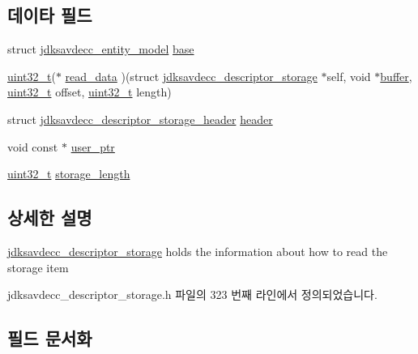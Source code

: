 \subsection*{데이타 필드}
\begin{DoxyCompactItemize}
\item 
struct \hyperlink{structjdksavdecc__entity__model}{jdksavdecc\+\_\+entity\+\_\+model} \hyperlink{structjdksavdecc__descriptor__storage_ab9b4b2eaa5e1a290a371291da6a9a4d6}{base}
\item 
\hyperlink{parse_8c_a6eb1e68cc391dd753bc8ce896dbb8315}{uint32\+\_\+t}($\ast$ \hyperlink{structjdksavdecc__descriptor__storage_ab52d121ecc306cef68974022b2789962}{read\+\_\+data} )(struct \hyperlink{structjdksavdecc__descriptor__storage}{jdksavdecc\+\_\+descriptor\+\_\+storage} $\ast$self, void $\ast$\hyperlink{_hello_test_8cpp_a8be6d469a7cd1c8d66cc6d2d1e10c65b}{buffer}, \hyperlink{parse_8c_a6eb1e68cc391dd753bc8ce896dbb8315}{uint32\+\_\+t} offset, \hyperlink{parse_8c_a6eb1e68cc391dd753bc8ce896dbb8315}{uint32\+\_\+t} length)
\item 
struct \hyperlink{structjdksavdecc__descriptor__storage__header}{jdksavdecc\+\_\+descriptor\+\_\+storage\+\_\+header} \hyperlink{structjdksavdecc__descriptor__storage_ab5243bc10c0547b567bfe308e571200e}{header}
\item 
void const $\ast$ \hyperlink{structjdksavdecc__descriptor__storage_a7b014caab0b5b593d13d50f3510afbfb}{user\+\_\+ptr}
\item 
\hyperlink{parse_8c_a6eb1e68cc391dd753bc8ce896dbb8315}{uint32\+\_\+t} \hyperlink{structjdksavdecc__descriptor__storage_a4c901ad7e199ca61d6cdadd2fce52b83}{storage\+\_\+length}
\end{DoxyCompactItemize}


\subsection{상세한 설명}
\hyperlink{structjdksavdecc__descriptor__storage}{jdksavdecc\+\_\+descriptor\+\_\+storage} holds the information about how to read the storage item 

jdksavdecc\+\_\+descriptor\+\_\+storage.\+h 파일의 323 번째 라인에서 정의되었습니다.



\subsection{필드 문서화}
